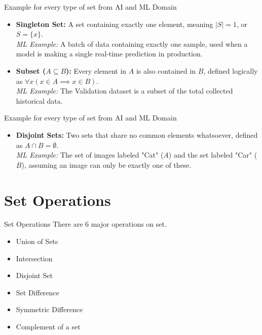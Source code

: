 \documentclass{beamer}
\begin{document}
\begin{frame}{Example for every type of set from AI and ML Domain }
    \begin{itemize}
        \item \textbf{Singleton Set:} A set containing exactly one element, meaning $|S| = 1$, or $S = \{x\}$.
        \\ \textit{ML Example:} A batch of data containing exactly one sample, used when a model is making a single real-time prediction in production.
        
        \vspace{0.5cm}
        \item \textbf{Subset ($A \subseteq B$):} Every element in $A$ is also contained in $B$, defined logically as $\forall x (x \in A \implies x \in B)$.
        \\ \textit{ML Example:} The Validation dataset is a subset of the total collected historical data.
    \end{itemize}
\end{frame}

\begin{frame}{Example for every type of set from AI and ML Domain }
    \begin{itemize}
        \item \textbf{Disjoint Sets:} Two sets that share no common elements whatsoever, defined as $A \cap B = \emptyset$.
        \\ \textit{ML Example:} The set of images labeled "Cat" ($A$) and the set labeled "Car" ($B$), assuming an image can only be exactly one of these.
    \end{itemize}
\end{frame}
\section{Set Operations}
\begin{frame}{Set Operations}
There are 6 major operations on set.
\begin{itemize}
    \item Union of Sets
    \item Intersection
    \item Disjoint Set
    \item Set Difference 
    \item Symmetric Difference
    \item Complement of a set   
\end{itemize}
    
\end{frame}
\end{document}
